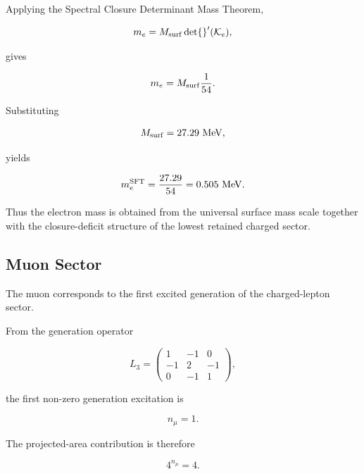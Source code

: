 \documentclass[11pt]{article}
\theoremstyle{definition}
\theoremstyle{remark}
\begin{document}
Applying the Spectral Closure Determinant Mass Theorem,

\begin{equation}
m_e =
M_{\rm surf}
\det{}'(\mathcal K_e),
\end{equation}

gives

\begin{equation}
m_e =
M_{\rm surf}
\frac{1}{54}.
\end{equation}

Substituting

\begin{equation}
M_{\rm surf} =
27.29~{\rm MeV},
\end{equation}

yields

\begin{equation}
m_e^{\rm SFT} = \frac{27.29}{54} = 0.505~{\rm MeV}.
\label{eq:electron_mass_sft}
\end{equation}

Thus the electron mass is obtained from the universal surface
mass scale together with the closure-deficit structure of the
lowest retained charged sector.


\subsection{Muon Sector}
\label{subsec:muon_sector}

The muon corresponds to the first excited generation of the
charged-lepton sector.

From the generation operator

\begin{equation}
L_3 =
\begin{pmatrix}
1 & -1 & 0 \\
-1 & 2 & -1 \\
0 & -1 & 1
\end{pmatrix},
\end{equation}

the first non-zero generation excitation is

\begin{equation}
n_\mu = 1.
\end{equation}

The projected-area contribution is therefore

\begin{equation}
4^{n_\mu} = 4.
\end{equation}
\end{document}

